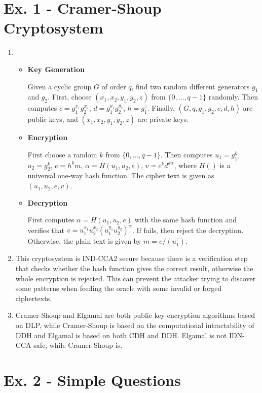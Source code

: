 \documentclass[12pt]{article}
\begin{document}
\section*{Ex. 1 - Cramer-Shoup Cryptosystem}

	\begin{enumerate}
		\item
			\begin{itemize}
				\item
					\textbf{Key Generation}

					Given a cyclic group $G$ of order $q$, find two random different generators $g_1$ and $g_2$. First, choose $(x_1,x_2,y_1,y_2,z)$ from $\{0,\ldots,q-1\}$ randomly. Then computes $c=g_1^{x_1}g_2^{x_2}$, $d=g_1^{y_1}g_2^{y_2}$, $h=g_1^z$. Finally, $(G,q,g_1,g_2,c,d,h)$ are public keys, and $(x_1,x_2,y_1,y_2,z)$ are private keys.
				\item
					\textbf{Encryption}

					First choose a random $k$ from $\{0,\ldots,q-1\}$. Then computes $u_1=g_1^k$, $u_2=g_2^k$, $e=h^km$, $\alpha=H(u_1,u_2,e)$, $v=c^kd^{k\alpha}$, where $H()$ is a universal one-way hash function. The cipher text is given as $(u_1,u_2,e,v)$.
				\item
					\textbf{Decryption}

					First computes $\alpha=H(u_1,u_2,e)$ with the same hash function and verifies that $v=u_1^{x_1}u_2^{x_2}(u_1^{y_1}u_2^{y_2})^{\alpha}$. If fails, then reject the decryption. Otherwise, the plain text is given by $m=e/(u_1^z)$.
			\end{itemize}
		\item
			This cryptosystem is IND-CCA2 secure because there is a verification step that checks whether the hash function gives the correct result, otherwise the whole encryption is rejected. This can prevent the attacker trying to discover some patterns when feeding the oracle with some invalid or forged ciphertexts.
		\item
			Cramer-Shoup and Elgamal are both public key encryption algorithms based on DLP, while Cramer-Shoup is based on the computational intractability of DDH and Elgamal is based on both CDH and DDH. Elgamal is not IDN-CCA safe, while Cramer-Shoup is.
	\end{enumerate}

\section*{Ex. 2 - Simple Questions}
\end{document}
